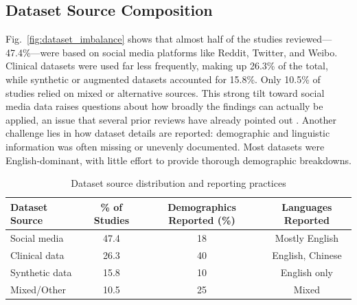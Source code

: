 \documentclass[sn-basic,authoryear]{sn-jnl}
\begin{document}
\subsection{Dataset Source Composition}
Fig.~\ref{fig:dataset_imbalance} shows that almost half of the studies reviewed—47.4\%—were based on social media platforms like Reddit, Twitter, and Weibo. Clinical datasets were used far less frequently, making up 26.3\% of the total, while synthetic or augmented datasets accounted for 15.8\%. Only 10.5\% of studies relied on mixed or alternative sources. This strong tilt toward social media data raises questions about how broadly the findings can actually be applied, an issue that several prior reviews have already pointed out \citep{Hua2024b, Ibrahimov2024}. 
Another challenge lies in how dataset details are reported: demographic and linguistic information was often missing or unevenly documented. Most datasets were English-dominant, with little effort to provide thorough demographic breakdowns.

\begin{table}
\centering
\caption{Dataset source distribution and reporting practices}
\label{tab:dataset_sources}
\begin{adjustbox}{width=\columnwidth,center}
\begin{tabular}{lccc}
\hline
\textbf{Dataset Source} & \textbf{\% of Studies} & \textbf{Demographics Reported (\%)} & \textbf{Languages Reported} \\
\hline
Social media   & 47.4 & 18 & Mostly English \\
Clinical data  & 26.3 & 40 & English, Chinese \\
Synthetic data & 15.8 & 10 & English only \\
Mixed/Other    & 10.5 & 25 & Mixed \\
\hline
\end{tabular}
\end{adjustbox}
\end{table}
\end{document}
